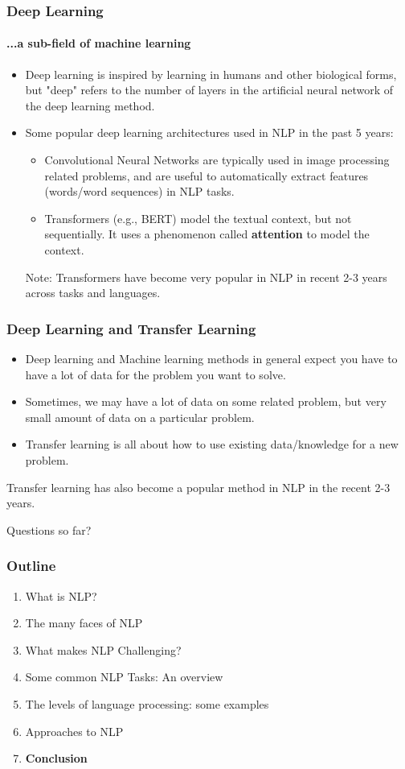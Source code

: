 \documentclass{beamer}
\begin{document}
\begin{frame}
\frametitle{Deep Learning}
\framesubtitle{...a sub-field of machine learning}
\begin{itemize}
    \item  Deep learning is inspired by learning in humans and other biological forms, but "deep" refers to the number of layers in the artificial neural network of the deep learning method. \pause
    \item Some popular deep learning architectures used in NLP in the past 5 years:
    \begin{itemize}
        \item Convolutional Neural Networks are typically used in image processing related problems, and are useful to automatically extract features (words/word sequences) in NLP tasks. 
        \item Transformers (e.g., BERT) model the textual context, but not sequentially. It uses a phenomenon called \textbf{attention} to model the context. 
    \end{itemize} \pause
   Note: Transformers have become very popular in NLP in recent 2-3 years across tasks and languages. 
\end{itemize}
\end{frame}

\begin{frame}
\frametitle{Deep Learning and Transfer Learning}
\begin{itemize}
    \item Deep learning and Machine learning methods in general expect you have to have a lot of data for the problem you want to solve.
    \item Sometimes, we may have a lot of data on some related problem, but very small amount of data on a particular problem.
    \item Transfer learning is all about how to use existing data/knowledge for a new problem. 
\end{itemize}
Transfer learning has also become a popular method in NLP in the recent 2-3 years. 
\end{frame}

\begin{frame}
\Large Questions so far?
\end{frame}

\begin{frame}
\frametitle{Outline}
\begin{enumerate}
    \item What is NLP?
    \item The many faces of NLP
    \item What makes NLP Challenging?
    \item Some common NLP Tasks: An overview
    \item The levels of language processing: some examples
    \item Approaches to NLP
    \item \textbf{Conclusion}
\end{enumerate}
\end{frame}
\end{document}
